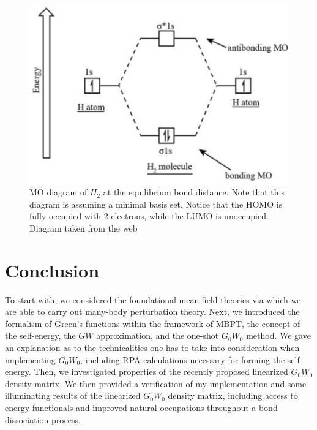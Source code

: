 \documentclass[12pt]{caltech_thesis}
\begin{document}
\begin{figure}[h]
    \centering
    \includegraphics[width=\textwidth]{h2_mo.png}
\caption{MO diagram of \(H_2\) at the equilibrium bond distance. Note that this diagram is assuming a minimal basis set. Notice that the HOMO is fully occupied with 2 electrons, while the LUMO is unoccupied. Diagram taken from the web \autocite{noauthor_molecular_nodate}}
\label{fig:h2_mo_diagram}
\end{figure}
\chapter{Conclusion}
To start with, we considered the foundational mean-field theories via which we are able to carry out many-body perturbation theory. Next, we introduced the formalism of Green's functions within the framework of MBPT, the concept of the self-energy, the $GW$ approximation, and the one-shot $G_0W_0$ method. We gave an explanation as to the technicalities one has to take into consideration when implementing $G_0W_0$, including RPA calculations necessary for forming the self-energy. Then, we investigated properties of the recently proposed linearized $G_0W_0$ density matrix. We then provided a verification of my implementation and some illuminating results of the linearized $G_0W_0$ density matrix, including access to energy functionals and improved natural occupations throughout a bond dissociation process.
\end{document}
